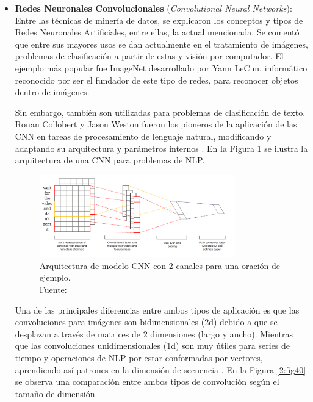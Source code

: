 \begin{itemize}
	\item \textbf{Redes Neuronales Convolucionales} (\textit{Convolutional Neural Networks}): Entre las técnicas de minería de datos, se explicaron los conceptos y tipos de Redes Neuronales Artificiales, entre ellas, la actual mencionada. Se comentó que entre sus mayores usos se dan actualmente en el tratamiento de imágenes, problemas de clasificación a partir de estas y visión por computador. El ejemplo más popular fue ImageNet desarrollado por Yann LeCun, informático reconocido por ser el fundador de este tipo de redes, para reconocer objetos dentro de imágenes.
	
	Sin embargo, también son utilizadas para problemas de clasificación de texto. Ronan Collobert y Jason Weston fueron los pioneros de la aplicación de las CNN en tareas de procesamiento de lenguaje natural, modificando y adaptando su arquitectura y parámetros internos \parencite{bk_kamath2019deeplearning_nlp_sr}. En la Figura \ref{2:fig39} se ilustra la arquitectura de una CNN para problemas de NLP.
	\begin{figure}[!ht]
		\begin{center}
			\includegraphics[width=0.8\textwidth]{2/figures/cnn_nlp.png}
			\caption[Arquitectura de modelo CNN con 2 canales para una oración de ejemplo]{Arquitectura de modelo CNN con 2 canales para una oración de ejemplo.\\
			Fuente: \cite{tec_kim2014convolutional}}
			\label{2:fig39}
		\end{center}
	\end{figure}
	
	Una de las principales diferencias entre ambos tipos de aplicación es que las convoluciones para imágenes son bidimensionales (2d) debido a que se desplazan a través de matrices de 2 dimensiones (largo y ancho). Mientras que las convoluciones unidimensionales (1d) son muy útiles para series de tiempo y operaciones de NLP por estar conformadas por vectores, aprendiendo así patrones en la dimensión de secuencia \parencite{bk_rao2019nlp_pytorch}. En la Figura \ref{2:fig40} se observa una comparación entre ambos tipos de convolución según el tamaño de dimensión.


\end{itemize}
